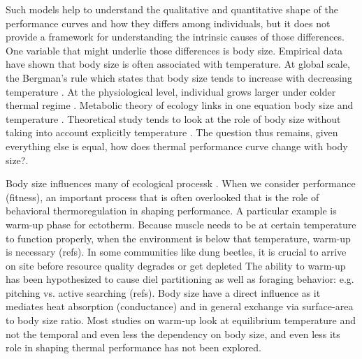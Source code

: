 Such models help to understand the qualitative and quantitative shape of the performance curves and how they differs  among individuals, but it does not provide a framework for understanding the intrinsic causes of those differences. %
One variable that might underlie those differences is body size.
Empirical data have shown that body size is often associated with temperature.  
At global scale, the Bergman's rule which states that body size tends to increase with decreasing temperature \citep{Bergman1847}.
At the physiological level, individual grows larger under colder thermal regime \citep{Van1996}.
Metabolic theory of ecology links in one equation body size and temperature \citep{Gilliolly2001,Brown2004}.
Theoretical study tends to look at the role of body size without taking into account explicitly temperature \citep[e.g.,]{Yodzis1992, Brown1993}.
The question thus remains, given everything else is equal, how does thermal performance curve change with body size?.

Body size influences many of ecological processk \citep{Peters1986}.
When we consider performance (fitness), an important process that is often overlooked that is the role of behavioral thermoregulation in shaping performance. 
A particular example is warm-up phase for ectotherm.
Because muscle needs to be at certain temperature to function properly, when the environment is below that temperature, warm-up is necessary (refs). 
In some communities like dung beetles, it is crucial to arrive on site before resource quality degrades or get depleted %
The ability to warm-up has been hypothesized to cause diel partitioning as well as foraging behavior: e.g. pitching vs. active searching (refs).
Body size have a direct influence as it mediates heat absorption (conductance) and in general exchange via surface-area to body size ratio.
Most studies on warm-up look at equilibrium temperature and not the temporal and even less the dependency on body size, and even less its role in shaping thermal performance has not been explored.
 

